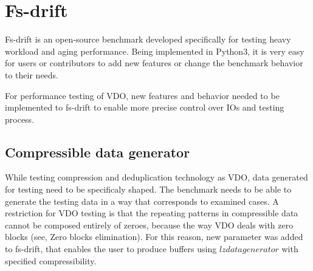 \documentclass[
  color, %
  table, %
  lof,   %
  lot,   %
]{fithesis3}
\begin{document}




\chapter{Fs-drift}
\label{fs-drift}

Fs-drift is an open-source benchmark developed specifically for testing heavy workload and aging performance. Being implemented in Python3, it is very easy for users or contributors to add new features or change the benchmark behavior to their needs.

For performance testing of VDO, new features and behavior needed to be implemented to fs-drift to enable more precise control over IOs and testing process.

\section{Compressible data generator}
While testing compression and deduplication technology as VDO, data generated for testing need to be specificaly shaped. The benchmark needs to be able to generate the testing data in a way that corresponds to examined cases. A restriction for VDO testing is that the repeating patterns in compressible data cannot be composed entirely of zeroes, because the way VDO deals with zero blocks (see, Zero blocks elimination). For this reason, new parameter was added to fs-drift, that enables the user to produce buffers using $lzdatagenerator$ with specified compressibility.
\end{document}
